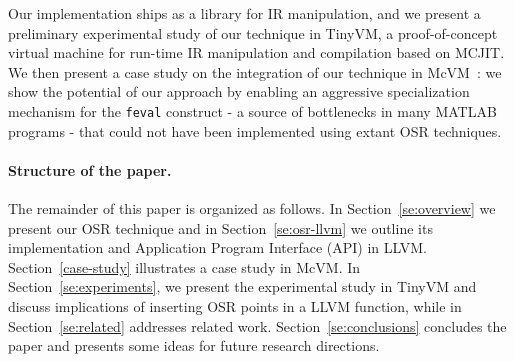 \noindent Our implementation ships as a library for IR manipulation, and we present a preliminary experimental study of our technique in TinyVM, a proof-of-concept virtual machine for run-time IR manipulation and compilation based on MCJIT. We then present a case study on the integration of our technique in McVM~\cite{chevalier2010mcvm}: we show the potential of our approach by enabling an aggressive specialization mechanism for the {\tt feval} construct - a source of bottlenecks in many MATLAB programs - that could not have been implemented using extant OSR techniques.

\paragraph{Structure of the paper.}
The remainder of this paper is organized as follows. In Section~\ref{se:overview} we present our OSR technique and in Section~\ref{se:osr-llvm} we outline its implementation and Application Program Interface (API) in LLVM. Section~\ref{case-study} illustrates a case study in McVM. In Section~\ref{se:experiments}, we present the experimental study in TinyVM and discuss implications of inserting OSR points in a LLVM function, while in Section~\ref{se:related} addresses related work. Section~\ref{se:conclusions} concludes the paper and presents some ideas for future research directions. 
  
  
  
  
  
  
  
  
  
  
  
  
  
  
  